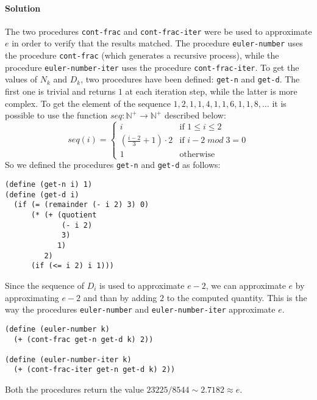 \paragraph{Solution} 
The two procedures \texttt{cont-frac} and \texttt{cont-frac-iter} were be used to approximate $ e $ in order to verify that the 
results matched. The procedure \texttt{euler-number} uses the procedure \texttt{cont-frac} (which generates a recursive process), 
while the procedure \texttt{euler-number-iter} uses the procedure \texttt{cont-frac-iter}.
To get the values of $ N_{k} $ and $ D_{k} $, two procedures have been defined: \texttt{get-n} and \texttt{get-d}. The first one
is trivial and returns $ 1 $ at each iteration step, while the latter is more complex.
To get the element of the sequence $ 1, 2, 1, 1, 4, 1, 1, 6, 1, 1, 8, \dots $ it is possible to use the function
$ seq: \mathbb{N}^{+} \to \mathbb{N}^{+} $ described below:
\[     
  seq(i) = 
  \begin{cases}
      i & \text{if } 1 \leq i \leq 2 \\
      \left(\frac{i - 2}{3} + 1 \right) \cdot 2  & \text{if } i - 2\;mod\;3 = 0\\
      1 & \text{otherwise}
  \end{cases} 
\]
So we defined the procedures \texttt{get-n} and \texttt{get-d} as follows:
\begin{lstlisting}[caption={Definition of the procedures \texttt{get-n} and \texttt{get-d}}, captionpos=b]
(define (get-n i) 1)
(define (get-d i)
  (if (= (remainder (- i 2) 3) 0)
      (* (+ (quotient
             (- i 2)
             3)
            1)
         2)
      (if (<= i 2) i 1)))
\end{lstlisting}
Since the sequence of $ D_{i} $ is used to approximate $ e - 2 $, we can approximate $ e $ by approximating $ e - 2 $ and than
by adding $ 2 $ to the computed quantity. This is the way the procedures \texttt{euler-number} and \texttt{euler-number-iter}
approximate $ e $.
\begin{lstlisting}
(define (euler-number k)
  (+ (cont-frac get-n get-d k) 2))

(define (euler-number-iter k)
  (+ (cont-frac-iter get-n get-d k) 2))
\end{lstlisting}
Both the procedures return the value $ 23225 / 8544 \sim 2.7182 \approx e $.